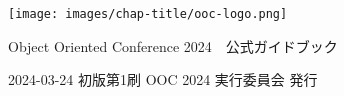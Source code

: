 \clearpage{\thispagestyle{empty}}
\begin{center}

\texttt{[image: images/chap-title/ooc-logo.png]}
\vspace{80pt}

\begin{sffamily}
\Large
Object Oriented Conference 2024　公式ガイドブック
\normalsize
\end{sffamily}
\vspace{80pt}

\begin{sffamily}
2024-03-24
\hspace{5pt}
初版第1刷
\hspace{5pt}
OOC 2024 実行委員会
\hspace{5pt}
発行
\end{sffamily}

\end{center}
